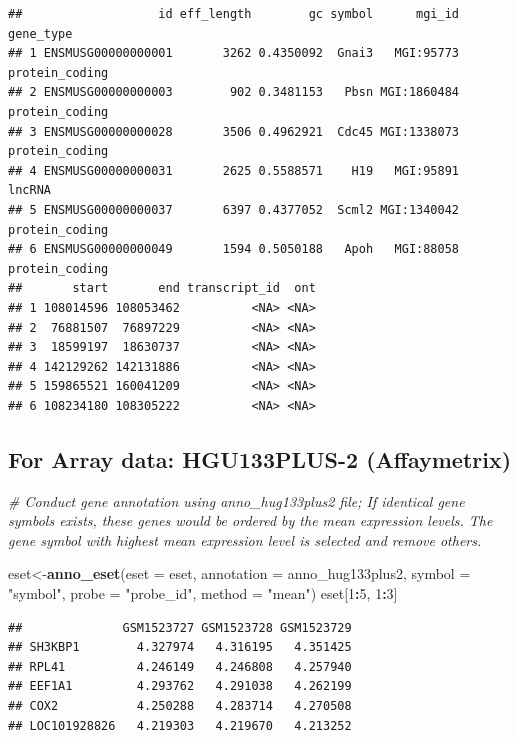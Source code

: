 \documentclass[
  12pt,
]{book}
\newenvironment{Shaded}{\begin{snugshade}}{\end{snugshade}}
\newcommand{\AttributeTok}[1]{\textcolor[rgb]{0.13,0.29,0.53}{#1}}
\newcommand{\CommentTok}[1]{\textcolor[rgb]{0.56,0.35,0.01}{\textit{#1}}}
\newcommand{\DecValTok}[1]{\textcolor[rgb]{0.00,0.00,0.81}{#1}}
\newcommand{\FunctionTok}[1]{\textcolor[rgb]{0.13,0.29,0.53}{\textbf{#1}}}
\newcommand{\NormalTok}[1]{#1}
\newcommand{\OtherTok}[1]{\textcolor[rgb]{0.56,0.35,0.01}{#1}}
\newcommand{\SpecialCharTok}[1]{\textcolor[rgb]{0.81,0.36,0.00}{\textbf{#1}}}
\newcommand{\StringTok}[1]{\textcolor[rgb]{0.31,0.60,0.02}{#1}}
\begin{document}
\begin{verbatim}
##                   id eff_length        gc symbol      mgi_id      gene_type
## 1 ENSMUSG00000000001       3262 0.4350092  Gnai3   MGI:95773 protein_coding
## 2 ENSMUSG00000000003        902 0.3481153   Pbsn MGI:1860484 protein_coding
## 3 ENSMUSG00000000028       3506 0.4962921  Cdc45 MGI:1338073 protein_coding
## 4 ENSMUSG00000000031       2625 0.5588571    H19   MGI:95891         lncRNA
## 5 ENSMUSG00000000037       6397 0.4377052  Scml2 MGI:1340042 protein_coding
## 6 ENSMUSG00000000049       1594 0.5050188   Apoh   MGI:88058 protein_coding
##       start       end transcript_id  ont
## 1 108014596 108053462          <NA> <NA>
## 2  76881507  76897229          <NA> <NA>
## 3  18599197  18630737          <NA> <NA>
## 4 142129262 142131886          <NA> <NA>
## 5 159865521 160041209          <NA> <NA>
## 6 108234180 108305222          <NA> <NA>
\end{verbatim}

\hypertarget{for-array-data-hgu133plus-2-affaymetrix}{%
\subsection{For Array data: HGU133PLUS-2 (Affaymetrix)}\label{for-array-data-hgu133plus-2-affaymetrix}}

\begin{Shaded}
\begin{Highlighting}[]
\CommentTok{\# Conduct gene annotation using \textasciigrave{}anno\_hug133plus2\textasciigrave{} file; If identical gene symbols exists, these genes would be ordered by the mean expression levels. The gene symbol with highest mean expression level is selected and remove others. }

\NormalTok{eset}\OtherTok{\textless{}{-}}\FunctionTok{anno\_eset}\NormalTok{(}\AttributeTok{eset       =}\NormalTok{ eset,}
                \AttributeTok{annotation =}\NormalTok{ anno\_hug133plus2,}
                \AttributeTok{symbol     =} \StringTok{"symbol"}\NormalTok{,}
                \AttributeTok{probe      =} \StringTok{"probe\_id"}\NormalTok{,}
                \AttributeTok{method     =} \StringTok{"mean"}\NormalTok{)}
\NormalTok{eset[}\DecValTok{1}\SpecialCharTok{:}\DecValTok{5}\NormalTok{, }\DecValTok{1}\SpecialCharTok{:}\DecValTok{3}\NormalTok{]}
\end{Highlighting}
\end{Shaded}

\begin{verbatim}
##              GSM1523727 GSM1523728 GSM1523729
## SH3KBP1        4.327974   4.316195   4.351425
## RPL41          4.246149   4.246808   4.257940
## EEF1A1         4.293762   4.291038   4.262199
## COX2           4.250288   4.283714   4.270508
## LOC101928826   4.219303   4.219670   4.213252
\end{verbatim}
\end{document}
